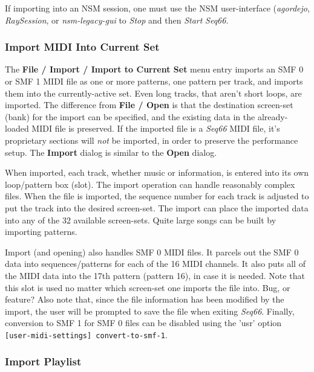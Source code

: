    If importing into an NSM session, one must use the NSM user-interface
   (\textsl{agordejo}, \textsl{RaySession}, or \textsl{nsm-legacy-gui}
   to \textsl{Stop} and then \textsl{Start} \textsl{Seq66}.

\subsubsection{Import MIDI Into Current Set}
\label{subsubsec:midi_export_file_import}

   The \textbf{File / Import / Import to Current Set} menu entry imports an SMF 0
   or SMF 1 MIDI file as one or more patterns, one pattern per track, and
   imports them into the currently-active set.
   Even long tracks, that aren't short loops, are imported.
   The difference from \textbf{File / Open} is that the destination screen-set
   (bank) for the import can be specified, and the existing data in the
   already-loaded MIDI file is preserved.
   If the imported file is a
   \textsl{Seq66} MIDI file, it's proprietary sections will
   \textsl{not} be imported, in order to preserve the performance setup.
   The \textbf{Import} dialog is similar to the \textbf{Open} dialog.

   When imported, each track, whether music or information,
   is entered into its own loop/pattern box (slot).
   The import operation can handle reasonably complex files.
   When the file is imported, the sequence number for each track is
   adjusted to put the track into the desired screen-set.
   The import can place the imported data into any of the 32 available
   screen-sets.  Quite large songs can be built by importing patterns.

   Import (and opening) also handles SMF 0 MIDI files.
   It parcels out the SMF 0 data
   into sequences/patterns for each of the 16 MIDI channels.  It also puts
   all of the MIDI data into the 17th pattern (pattern 16), in case it is
   needed.  Note that this slot is used no matter which screen-set one imports
   the file into.  Bug, or feature?
   Also note that, since the file information has been modified by the import,
   the user will be prompted to save the file when exiting \textsl{Seq66}.
   Finally, conversion to SMF 1 for SMF 0 files can be disabled using the
   'usr' option \texttt{[user-midi-settings] convert-to-smf-1}.

\subsubsection{Import Playlist}
\label{subsubsec:midi_export_file_import_playlist}

